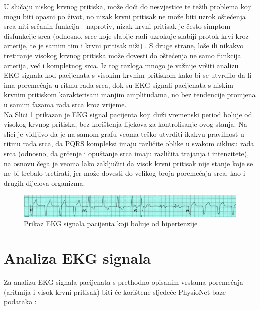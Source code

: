 \documentclass[12pt,a4paper]{article}
\begin{document}
U slučaju niskog krvnog pritiska, može doći do nesvjestice te težih problema koji mogu biti opasni po život, no nizak krvni pritisak ne može biti uzrok oštećenja srca niti srčanih funkcija - naprotiv, nizak krvni pritisak je često simptom disfunkcije srca (odnosno, srce koje slabije radi uzrokuje slabiji protok krvi kroz arterije, te je samim tim i krvni pritisak niži) \cite{low-pressure}. S druge strane, loše ili nikakvo tretiranje visokog krvnog pritiska može dovesti do oštećenja ne samo funkcija arterija, već i kompletnog srca. Iz tog razloga mnogo je važnije vršiti analizu EKG signala kod pacijenata s visokim krvnim pritiskom kako bi se utvrdilo da li ima poremećaja u ritmu rada srca, dok su EKG signali pacijenata s niskim krvnim pritiskom karakterisani manjim amplitudama, no bez tendencije promjena u samim fazama rada srca kroz vrijeme. \cite{high-pressure} \\

Na Slici \ref{s5} prikazan je EKG signal pacijenta koji duži vremenski period boluje od visokog krvnog pritiska, bez korištenja lijekova za kontrolisanje ovog stanja. Na slici je vidljivo da je na samom grafu veoma teško utvrditi ikakvu pravilnost u ritmu rada srca, da PQRS kompleksi imaju različite oblike u svakom ciklusu rada srca (odnosno, da grčenje i opuštanje srca imaju različita trajanja i intenzitete), na osnovu čega je veoma lako zaključiti da visok krvni pritisak nije stanje koje se ne bi trebalo tretirati, jer može dovesti do velikog broja poremećaja srca, kao i drugih dijelova organizma. \cite{pressure-ECG}

\begin{figure}[H]
\center
\includegraphics[scale=0.7]{../res/s5.PNG}
\caption{Prikaz EKG signala pacijenta koji boluje od hipertenzije \cite{pressure-ECG}}
\label{s5}
\end{figure}

\newpage

\section{Analiza EKG signala}

\quad Za analizu EKG signala pacijenata s prethodno opisanim vrstama poremećaja (aritmija i visok krvni pritisak) biti će korištene sljedeće PhysioNet baze podataka \cite{physionet}:
\end{document}
